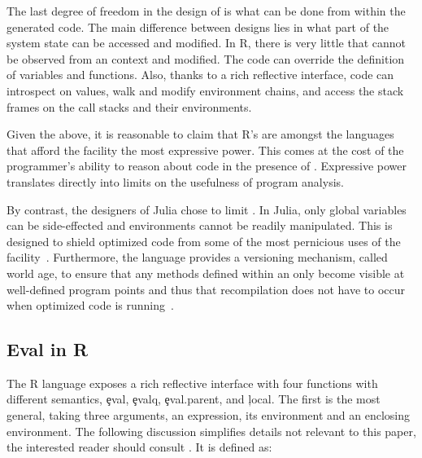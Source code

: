 \documentclass[screen,acmsmall]{acmart}
\begin{document}
The last degree of freedom in the design of \eval is what can be done from
within the generated code. The main difference between designs lies in what part
of the system state can be accessed and modified. In R, there is very little
that cannot be observed from an \eval context and modified. The code can
override the definition of variables and functions. Also, thanks to a rich
reflective interface, code can introspect on values, walk and modify environment
chains, and access the stack frames on the call stacks and their environments.

Given the above, it is reasonable to claim that R's \eval are amongst the
languages that afford the facility the most expressive power. This comes at the
cost of the programmer's ability to reason about code in the presence of \eval.
Expressive power translates directly into limits on the usefulness of program
analysis.

By contrast, the designers of Julia chose to limit \eval. In Julia, only global
variables can be side-effected and environments cannot be readily manipulated.
This is designed to shield optimized code from some of the most pernicious uses
of the facility~\cite{oopsla18a}. Furthermore, the language provides a
versioning mechanism, called world age, to ensure that any methods defined
within an \eval only become visible at well-defined program points and thus that
recompilation does not have to occur when optimized code is
running~\cite{oopsla20a}.

\subsection{Eval in R}

The R language exposes a rich reflective interface with four functions with
different semantics, \c{eval}, \c{evalq}, \c{eval.parent}, and
\c{local}. The first is the most general, taking three arguments, an expression,
its environment and an enclosing environment. The following discussion
simplifies details not relevant to this paper, the interested reader should
consult \citet{hadley}. It is defined as:
\end{document}
